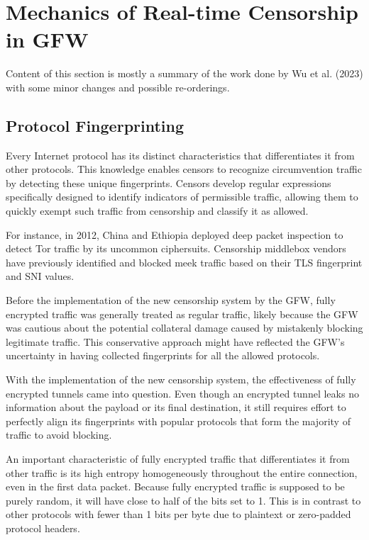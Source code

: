 \section{Mechanics of Real-time Censorship in GFW}
Content of this section is mostly a summary of the work done by Wu et al. (2023) with some minor changes  and possible re-orderings.\cite{wu2023great}

\subsection{Protocol Fingerprinting}
Every Internet protocol has its distinct characteristics that differentiates it from other protocols. This knowledge enables censors to recognize circumvention traffic by detecting these unique fingerprints. Censors develop regular expressions specifically designed to identify indicators of permissible traffic, allowing them to quickly exempt such traffic from censorship and classify it as allowed.

For instance, in 2012, China and Ethiopia deployed deep packet inspection to detect Tor traffic by its uncommon ciphersuits. Censorship middlebox vendors have previously identified and blocked meek traffic based on their TLS fingerprint and SNI values.\cite{wu2023great}

Before the implementation of the new censorship system by the GFW, fully encrypted traffic was generally treated as regular traffic, likely because the GFW was cautious about the potential collateral damage caused by mistakenly blocking legitimate traffic. This conservative approach might have reflected the GFW's uncertainty in having collected fingerprints for all the allowed protocols.

With the implementation of the new censorship system, the effectiveness of fully encrypted tunnels came into question. Even though an encrypted tunnel leaks no information about the payload or its final destination, it still requires effort to perfectly align its fingerprints with popular protocols that form the majority of traffic to avoid blocking.

An important characteristic of fully encrypted traffic that differentiates it from other traffic is its high entropy homogeneously throughout the entire connection, even in the first data packet. Because fully encrypted traffic is supposed to be purely random, it will have close to half of the bits set to 1. This is in contrast to other protocols with fewer than 1 bits per byte due to plaintext or zero-padded protocol headers.\cite{wu2023great}

